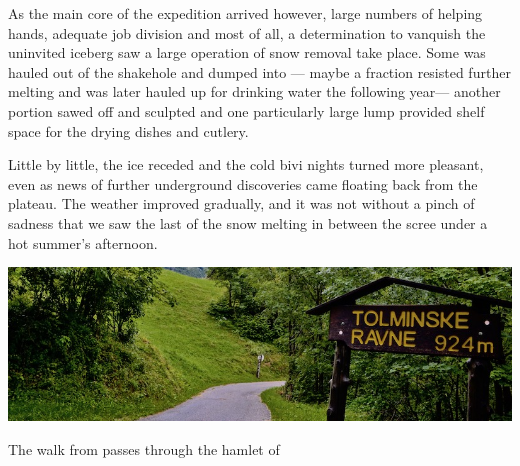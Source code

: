 As the main core of the expedition arrived however, large numbers of helping hands, adequate job division and most of all, a determination to vanquish the uninvited iceberg saw a large operation of snow removal take place. Some was hauled out of the shakehole and dumped into  --- maybe a fraction resisted further melting and was later hauled up for drinking water the following year--- another portion sawed off and sculpted and one particularly large lump provided shelf space for the drying dishes and cutlery.

Little by little, the ice receded and the cold bivi nights turned more pleasant, even as news of further underground discoveries came floating back from the plateau. The weather improved gradually, and it was not without a pinch of sadness that we saw the last of the snow melting in between the scree under a hot summer's afternoon.


\begin{pagefigure}
\checkoddpage \ifoddpage \forcerectofloat \else \forceversofloat \fi
   \centering
\includegraphics[width = \textwidth]{images/2014/welcome-2014/DSC_1201.jpg}
\caption{The walk from \protect{} passes through the hamlet of \protect{} } \label{fig:ravne_sign}
\end{pagefigure}

